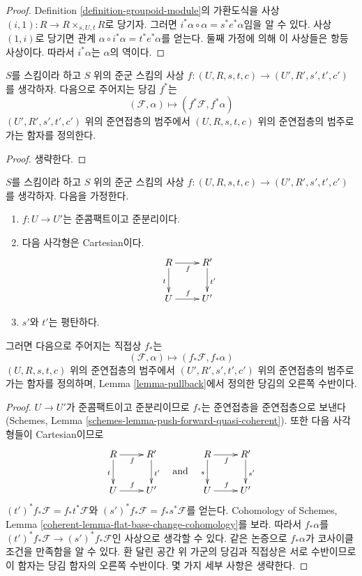 \begin{proof}
Definition \ref{definition-groupoid-module}의 가환도식을 사상
$(i, 1) : R \to R \times_{s, U, t} R$로 당기자. 그러면 $i^*\alpha \circ \alpha = s^*e^*\alpha$임을 알 수 있다.
사상 $(1, i)$로 당기면 관계 $\alpha \circ i^*\alpha = t^*e^*\alpha$를 얻는다. 둘째 가정에 의해 이 사상들은
항등사상이다. 따라서 $i^*\alpha$는 $\alpha$의 역이다.
\end{proof}

\begin{lemma}
\label{lemma-pullback}
$S$를 스킴이라 하고 $S$ 위의 준군 스킴의 사상
$f : (U, R, s, t, c) \to (U', R', s', t', c')$를 생각하자. 다음으로 주어지는 당김 $f^*$는
$$
(\mathcal{F}, \alpha) \mapsto (f^*\mathcal{F}, f^*\alpha)
$$
$(U', R', s', t', c')$ 위의 준연접층의 범주에서 $(U, R, s, t, c)$ 위의 준연접층의 범주로 가는 함자를 정의한다.
\end{lemma}

\begin{proof}
생략한다.
\end{proof}

\begin{lemma}
\label{lemma-pushforward}
$S$를 스킴이라 하고 $S$ 위의 준군 스킴의 사상
$f : (U, R, s, t, c) \to (U', R', s', t', c')$를 생각하자. 다음을 가정한다.
\begin{enumerate}
\item $f : U \to U'$는 준콤팩트이고 준분리이다.
\item 다음 사각형은 Cartesian이다.
$$
\xymatrix{
R \ar[d]_t \ar[r]_f & R' \ar[d]^{t'} \\
U \ar[r]^f & U'
}
$$
\item $s'$와 $t'$는 평탄하다.
\end{enumerate}
그러면 다음으로 주어지는 직접상 $f_*$는
$$
(\mathcal{F}, \alpha) \mapsto (f_*\mathcal{F}, f_*\alpha)
$$
$(U, R, s, t, c)$ 위의 준연접층의 범주에서 $(U', R', s', t', c')$ 위의 준연접층의 범주로 가는 함자를 정의하며,
Lemma \ref{lemma-pullback}에서 정의한 당김의 오른쪽 수반이다.
\end{lemma}

\begin{proof}
$U \to U'$가 준콤팩트이고 준분리이므로 $f_*$는 준연접층을 준연접층으로 보낸다(Schemes, Lemma
\ref{schemes-lemma-push-forward-quasi-coherent}). 또한 다음 사각형들이 Cartesian이므로
$$
\vcenter{
\xymatrix{
R \ar[d]_t \ar[r]_f & R' \ar[d]^{t'} \\
U \ar[r]^f & U'
}
}
\quad\text{and}\quad
\vcenter{
\xymatrix{
R \ar[d]_s \ar[r]_f & R' \ar[d]^{s'} \\
U \ar[r]^f & U'
}
}
$$
$(t')^*f_*\mathcal{F} = f_*t^*\mathcal{F}$와 $(s')^*f_*\mathcal{F} = f_*s^*\mathcal{F}$를 얻는다.
Cohomology of Schemes, Lemma \ref{coherent-lemma-flat-base-change-cohomology}를 보라. 따라서 $f_*\alpha$를
$(t')^*f_*\mathcal{F} \to (s')^*f_*\mathcal{F}$인 사상으로 생각할 수 있다. 같은 논증으로 $f_*\alpha$가 코사이클 조건을
만족함을 알 수 있다. 환 달린 공간 위 가군의 당김과 직접상은 서로 수반이므로 이 함자는 당김 함자의 오른쪽 수반이다.
몇 가지 세부 사항은 생략한다.
\end{proof}

